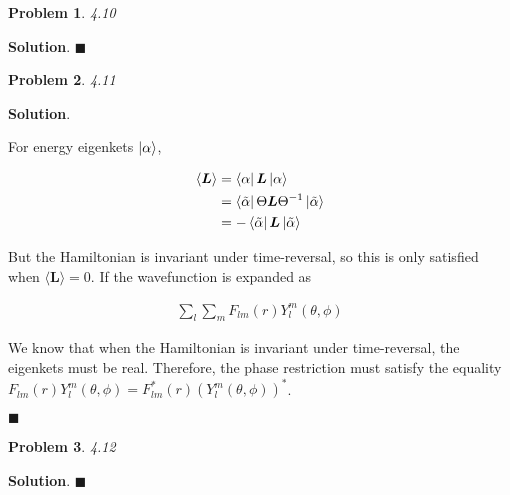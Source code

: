 \documentclass[12pt]{article}
\newtheorem{p}{Problem}
\theoremstyle{definition}
\newenvironment{s}{%
        \begin{trivlist} \item \textbf{Solution}. }{%
            \hspace*{\fill} $\blacksquare$\end{trivlist}}%
\begin{document}
{\begin{p}
4.10
\end{p}

\begin{s}
\end{s}


\begin{p}
4.11
\end{p}

\begin{s}

For energy eigenkets $\ket{\alpha}$,

\begin{align*}
\langle \bm{L}\rangle &= \bra{\alpha}\bm{L}\ket{\alpha} \\
&= \bra{\tilde{\alpha}}\Theta\bm{L}\Theta^{-1}\ket{\tilde{\alpha}}\\
&= -\bra{\tilde{\alpha}}\bm{L}\ket{\tilde{\alpha}}
\end{align*}

But the Hamiltonian is invariant under time-reversal, so this is only satisfied when $\langle \bm{L}\rangle = 0$. If the wavefunction is expanded as

\begin{align*}
\sum_{l}\sum_{m}F_{lm}(r)Y_{l}^{m}(\theta,\phi)
\end{align*}

We know that when the Hamiltonian is invariant under time-reversal, the eigenkets must be real. Therefore, the phase restriction must satisfy the equality $F_{lm}(r)Y_{l}^{m}(\theta,\phi) = F_{lm}^{*}(r)(Y_{l}^{m}(\theta,\phi))^{*}$.

\end{s}

\begin{p}
4.12
\end{p}

\begin{s}
\end{s}
\end{document}
